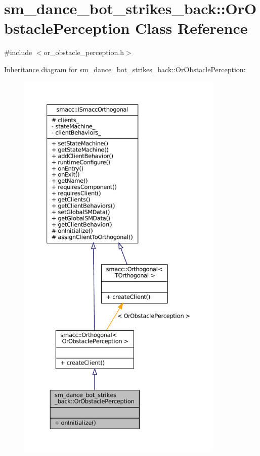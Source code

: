 \hypertarget{classsm__dance__bot__strikes__back_1_1OrObstaclePerception}{}\section{sm\+\_\+dance\+\_\+bot\+\_\+strikes\+\_\+back\+:\+:Or\+Obstacle\+Perception Class Reference}
\label{classsm__dance__bot__strikes__back_1_1OrObstaclePerception}


{\ttfamily \#include $<$or\+\_\+obstacle\+\_\+perception.\+h$>$}



Inheritance diagram for sm\+\_\+dance\+\_\+bot\+\_\+strikes\+\_\+back\+:\+:Or\+Obstacle\+Perception\+:
\nopagebreak
\begin{figure}[H]
\begin{center}
\leavevmode
\includegraphics[height=550pt]{classsm__dance__bot__strikes__back_1_1OrObstaclePerception__inherit__graph}
\end{center}
\end{figure}


